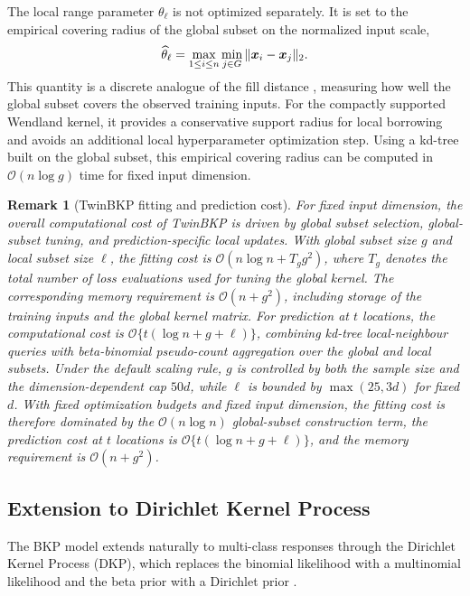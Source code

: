 \documentclass[article, shortnames]{jss}
\newtheorem{remark}{Remark}
\renewcommand{\vec}[1]{\mbox{\boldmath ${#1}$}}
\begin{document}
The local range parameter $\theta_\ell$ is not optimized separately. 
It is set to the empirical covering radius \citep{Vakayil2024TwinGP} of the global subset on the normalized input scale,
\[
\widehat{\theta}_\ell 
= \max_{1\le i\le n} \min_{j\in G} \|\vec{x}_i-\vec{x}_j\|_2 .
\]
This quantity is a discrete analogue of the fill distance \citep{Fasshauer2007Meshfree}, measuring how well the global subset covers the observed training inputs. 
For the compactly supported Wendland kernel, it provides a conservative support radius for local borrowing and avoids an additional local hyperparameter optimization step.
Using a kd-tree built on the global subset, this empirical covering radius can be computed in $\mathcal{O}(n\log g)$ time for fixed input dimension.

\begin{remark}[TwinBKP fitting and prediction cost]
	For fixed input dimension, the overall computational cost of TwinBKP is driven by global subset selection, global-subset tuning, and prediction-specific local updates. 
	With global subset size $g$ and local subset size $\ell$, the fitting cost is 
	$\mathcal{O}(n\log n + T_g g^2)$, where $T_g$ denotes the total number of loss evaluations used for tuning the global kernel. 
	The corresponding memory requirement is $\mathcal{O}(n+g^2)$, including storage of the training inputs and the global kernel matrix. 
	For prediction at $t$ locations, the computational cost is $\mathcal{O}\{t(\log n+g+\ell)\}$, combining kd-tree local-neighbour queries with beta-binomial pseudo-count aggregation over the global and local subsets.	
	Under the default scaling rule, $g$ is controlled by both the sample size and the dimension-dependent cap $50d$, while $\ell$ is bounded by $\max(25,3d)$ for fixed $d$. 
	With fixed optimization budgets and fixed input dimension, the fitting cost is therefore dominated by the $\mathcal{O}(n\log n)$ global-subset construction term, the prediction cost at $t$ locations is $\mathcal{O}\{t(\log n+g+\ell)\}$, and the memory requirement is $\mathcal{O}(n+g^2)$.
\end{remark}

\subsection{Extension to Dirichlet Kernel Process}\label{sec:dkp}

The BKP model extends naturally to multi-class responses through the Dirichlet Kernel Process (DKP), which replaces the binomial likelihood with a multinomial likelihood and the beta prior with a Dirichlet prior \citep{MacKenzie2014}. 
\end{document}
